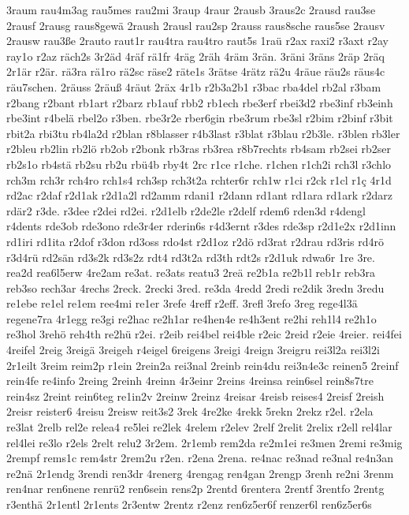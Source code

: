 {3raum
rau4m3ag
rau5mes
rau2mi
3raup
4raur
2rausb
3raus2c
2rausd
rau3se
2rausf
2rausg
raus8gewä
2raush
2rausl
rau2sp
2rauss
raus8sche
raus5se
2rausv
2rausw
rau3ße
2rauto
raut1r
rau4tra
rau4tro
raut5s
1raü
r2ax
raxi2
r3axt
r2ay
ray1o
r2az
räch2s
3r2äd
4räf
rä1fr
4räg
2räh
4räm
3rän.
3räni
3räns
2räp
2räq
2r1är
r2är.
rä3ra
rä1ro
rä2sc
räse2
räte1s
3rätse
4rätz
rä2u
4räue
räu2s
räus4c
räu7schen.
2räuss
2räuß
4räut
2räx
4r1b
r2b3a2b1
r3bac
rba4del
rb2al
r3bam
r2bang
r2bant
rb1art
r2barz
rb1auf
rbb2
rb1ech
rbe3erf
rbei3d2
rbe3inf
rb3einh
rbe3int
r4belä
rbel2o
r3ben.
rbe3r2e
rber6gin
rbe3rum
rbe3sl
r2bim
r2binf
r3bit
rbit2a
rbi3tu
rb4la2d
r2blan
r8blasser
r4b3last
r3blat
r3blau
r2b3le.
r3blen
rb3ler
r2bleu
rb2lin
rb2lö
rb2ob
r2bonk
rb3ras
rb3rea
r8b7rechts
rb4sam
rb2sei
rb2ser
rb2s1o
rb4stä
rb2su
rb2u
rbü4b
rby4t
2rc
r1ce
r1che.
r1chen
r1ch2i
rch3l
r3chlo
rch3m
rch3r
rch4ro
rch1s4
rch3sp
rch3t2a
rchter6r
rch1w
r1ci
r2ck
r1cl
r1ç
4r1d
rd2ac
r2daf
r2d1ak
r2d1a2l
rd2amm
rdani1
r2dann
rd1ant
rd1ara
rd1ark
r2darz
rdär2
r3de.
r3dee
r2dei
rd2ei.
r2d1elb
r2de2le
r2delf
rdem6
rden3d
r4dengl
r4dents
rde3ob
rde3ono
rde3r4er
rderin6s
r4d3ernt
r3des
rde3sp
r2d1e2x
r2d1inn
rd1iri
rd1ita
r2dof
r3don
rd3oss
rdo4st
r2d1oz
r2dö
rd3rat
r2drau
rd3ris
rd4rö
r3d4rü
rd2sän
rd3s2k
rd3s2z
rdt4
rd3t2a
rd3th
rdt2s
r2d1uk
rdwa6r
1re
3re.
rea2d
rea6l5erw
4re2am
re3at.
re3ats
reatu3
2reä
re2b1a
re2b1l
reb1r
reb3ra
reb3so
rech3ar
4rechs
2reck.
2recki
3red.
re3da
4redd
2redi
re2dik
3redn
3redu
re1ebe
re1el
re1em
ree4mi
re1er
3refe
4reff
r2eff.
3refl
3refo
3reg
rege4l3ä
regene7ra
4r1egg
re3gi
re2hac
re2h1ar
re4hen4e
re4h3ent
re2hi
reh1l4
re2h1o
re3hol
3rehö
reh4th
re2hü
r2ei.
r2eib
rei4bel
rei4ble
r2eic
2reid
r2eie
4reier.
rei4fei
4reifel
2reig
3reigä
3reigeh
r4eigel
6reigens
3reigi
4reign
3reigru
rei3l2a
rei3l2i
2r1eilt
3reim
reim2p
r1ein
2rein2a
rei3nal
2reinb
rein4du
rei3n4e3c
reinen5
2reinf
rein4fe
re4info
2reing
2reinh
4reinn
4r3einr
2reins
4reinsa
rein6sel
rein8s7tre
rein4sz
2reint
rein6teg
re1in2v
2reinw
2reinz
4reisar
4reisb
reises4
2reisf
2reish
2reisr
reister6
4reisu
2reisw
reit3s2
3rek
4re2ke
4rekk
5rekn
2rekz
r2el.
r2ela
re3lat
2relb
rel2e
relea4
re5lei
re2lek
4relem
r2elev
2relf
2relit
2relix
r2ell
rel4lar
rel4lei
re3lo
r2els
2relt
relu2
3r2em.
2r1emb
rem2da
re2m1ei
re3men
2remi
re3mig
2rempf
rems1c
rem4str
2rem2u
r2en.
r2ena
2rena.
re4nac
re3nad
re3nal
re4n3an
re2nä
2r1endg
3rendi
ren3dr
4renerg
4rengag
ren4gan
2rengp
3renh
re2ni
3renm
ren4nar
ren6nene
renrü2
ren6sein
rens2p
2rentd
6rentera
2rentf
3rentfo
2rentg
r3enthä
2r1entl
2r1ents
2r3entw
2rentz
r2enz
ren6z5er6f
renzer6l
ren6z5er6s
}
